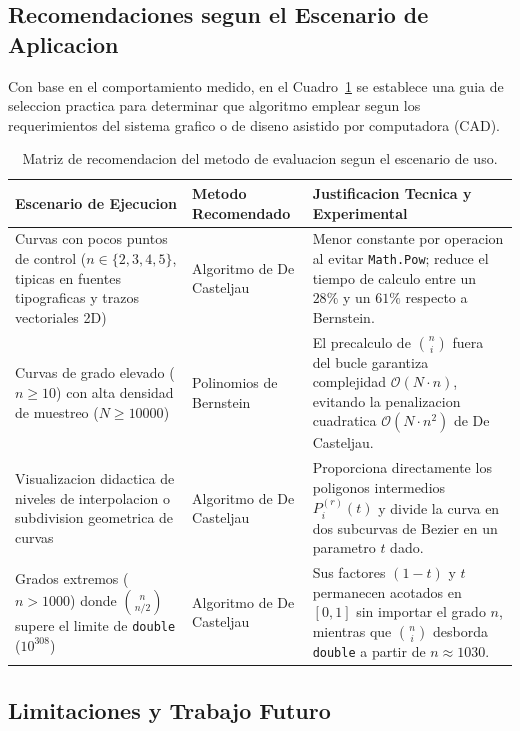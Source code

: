 \subsection{Recomendaciones segun el Escenario de Aplicacion}
\label{subsec:conc_recomendaciones}

Con base en el comportamiento medido, en el Cuadro~\ref{tab:conc_guia} se establece una guia de seleccion practica para determinar que algoritmo emplear segun los requerimientos del sistema grafico o de diseno asistido por computadora (CAD).

\begin{table}[H]
\centering
\caption{Matriz de recomendacion del metodo de evaluacion segun el escenario de uso.}
\label{tab:conc_guia}
\small
\begin{tabular}{p{4.2cm} p{3.2cm} p{6.8cm}}
\toprule
\textbf{Escenario de Ejecucion} & \textbf{Metodo Recomendado} & \textbf{Justificacion Tecnica y Experimental} \\
\midrule
Curvas con pocos puntos de control ($n \in \{2, 3, 4, 5\}$, tipicas en fuentes tipograficas y trazos vectoriales 2D) & Algoritmo de De Casteljau & Menor constante por operacion al evitar \texttt{Math.Pow}; reduce el tiempo de calculo entre un $28\%$ y un $61\%$ respecto a Bernstein. \\
\midrule
Curvas de grado elevado ($n \ge 10$) con alta densidad de muestreo ($N \ge 10000$) & Polinomios de Bernstein & El precalculo de $\binom{n}{i}$ fuera del bucle garantiza complejidad $\mathcal{O}(N \cdot n)$, evitando la penalizacion cuadratica $\mathcal{O}(N \cdot n^2)$ de De Casteljau. \\
\midrule
Visualizacion didactica de niveles de interpolacion o subdivision geometrica de curvas & Algoritmo de De Casteljau & Proporciona directamente los poligonos intermedios $P_i^{(r)}(t)$ y divide la curva en dos subcurvas de Bezier en un parametro $t$ dado. \\
\midrule
Grados extremos ($n > 1000$) donde $\binom{n}{n/2}$ supere el limite de \texttt{double} ($10^{308}$) & Algoritmo de De Casteljau & Sus factores $(1-t)$ y $t$ permanecen acotados en $[0,1]$ sin importar el grado $n$, mientras que $\binom{n}{i}$ desborda \texttt{double} a partir de $n \approx 1030$. \\
\bottomrule
\end{tabular}
\end{table}

\subsection{Limitaciones y Trabajo Futuro}
\label{subsec:conc_futuro}

